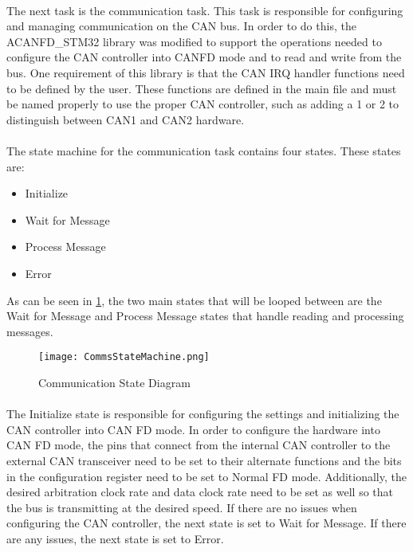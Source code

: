 \paragraph{}
The next task is the communication task.
This task is responsible for configuring and managing communication on the CAN bus.
In order to do this, the ACANFD\_STM32 library was modified to support the operations needed to configure the CAN controller into CANFD mode and to read and write from the bus.
One requirement of this library is that the CAN IRQ handler functions need to be defined by the user.
These functions are defined in the main file and must be named properly to use the proper CAN controller, such as adding a 1 or 2 to distinguish between CAN1 and CAN2 hardware.

\paragraph{}
The state machine for the communication task contains four states.
These states are:
\begin{itemize}
	\item Initialize
	\item Wait for Message
	\item Process Message
	\item Error
\end{itemize}
As can be seen in \cref{fig:CommsDiagram}, the two main states that will be looped between are the Wait for Message and Process Message states that handle reading and processing messages.

\begin{figure}[H]
	\centering
	\texttt{[image: CommsStateMachine.png]}
	\caption{Communication State Diagram}
	\label{fig:CommsDiagram}
\end{figure}

\paragraph{}
The Initialize state is responsible for configuring the settings and initializing the CAN controller into CAN FD mode.
In order to configure the hardware into CAN FD mode, the pins that connect from the internal CAN controller to the external CAN transceiver need to be set to their alternate functions and the bits in the configuration register need to be set to Normal FD mode.
Additionally, the desired arbitration clock rate and data clock rate need to be set as well so that the bus is transmitting at the desired speed.
If there are no issues when configuring the CAN controller, the next state is set to Wait for Message.
If there are any issues, the next state is set to Error.

